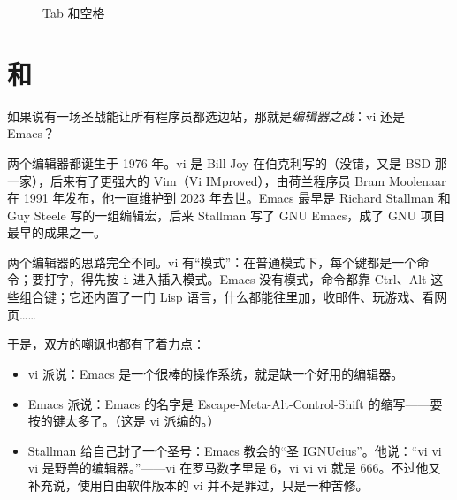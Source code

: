 \begin{figure}[htbp]
  \centering
  \caption{Tab 和空格}
  \label{fig:tabs}
\end{figure}

\section{\texorpdfstring{}{Vim} 和 \texorpdfstring{}{Emacs}}

如果说有一场圣战能让所有程序员都选边站，那就是\emph{编辑器之战}：vi 还是 Emacs？

两个编辑器都诞生于 1976 年。vi 是 Bill Joy 在伯克利写的（没错，又是 BSD 那一家），后来有了更强大的 Vim（Vi IMproved），由荷兰程序员 Bram Moolenaar 在 1991 年发布，他一直维护到 2023 年去世。Emacs 最早是 Richard Stallman 和 Guy Steele 写的一组编辑宏，后来 Stallman 写了 GNU Emacs，成了 GNU 项目最早的成果之一。

两个编辑器的思路完全不同。vi 有“模式”：在普通模式下，每个键都是一个命令；要打字，得先按 \texttt{i} 进入插入模式。Emacs 没有模式，命令都靠 Ctrl、Alt 这些组合键；它还内置了一门 Lisp 语言，什么都能往里加，收邮件、玩游戏、看网页……

于是，双方的嘲讽也都有了着力点：
\begin{itemize}
  \item vi 派说：Emacs 是一个很棒的操作系统，就是缺一个好用的编辑器。
  \item Emacs 派说：Emacs 的名字是 Escape-Meta-Alt-Control-Shift 的缩写——要按的键太多了。（这是 vi 派编的。）
  \item Stallman 给自己封了一个圣号：Emacs 教会的“圣 IGNUcius”。他说：“vi vi vi 是野兽的编辑器。”——vi 在罗马数字里是 6，vi vi vi 就是 666。不过他又补充说，使用自由软件版本的 vi 并不是罪过，只是一种苦修。
\end{itemize}

